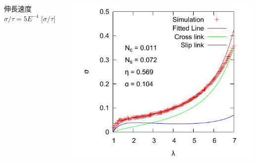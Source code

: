 \documentclass[11pt, dvipdfmx]{beamer}
\begin{document}
\begin{frame}
\begin{columns}[totalwidth=1\textwidth]
\begin{center}
伸長速度 $\sigma/\tau = 5E^{-4}$ [$\sigma/\tau$]
\end{center}
\vspace{-3mm}
\includegraphics[width=\columnwidth]{./fig/E_V_5e-4.pdf}
\end{columns}
\end{frame}
%
%
%
\end{document}
